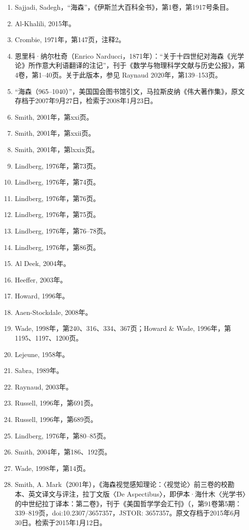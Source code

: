 \begin{enumerate}
\item Sajjadi, Sadegh，“海森”，《伊斯兰大百科全书》，第1卷，第1917号条目。
\item Al-Khalili, 2015年。
\item Crombie, 1971年，第147页，注释2。
\item 恩里科·纳尔杜奇（Enrico Narducci，1871年）：“关于十四世纪对海森《光学论》所作意大利语翻译的注记”，刊于《数学与物理科学文献与历史公报》，第4卷，第1–40页。关于此版本，参见 Raynaud 2020年，第139–153页。
\item “海森（965–1040）”，美国国会图书馆引文，马拉斯皮纳《伟大著作集》，原文存档于2007年9月27日，检索于2008年1月23日。
\item Smith, 2001年，第xxi页。
\item Smith, 2001年，第xxii页。
\item Smith, 2001年，第lxxix页。
\item Lindberg, 1976年，第73页。
\item Lindberg, 1976年，第74页。
\item Lindberg, 1976年，第76页。
\item Lindberg, 1976年，第75页。
\item Lindberg, 1976年，第76–78页。
\item Lindberg, 1976年，第86页。
\item Al Deek, 2004年。
\item Heeffer, 2003年。
\item Howard, 1996年。
\item Aaen-Stockdale, 2008年。
\item Wade, 1998年，第240、316、334、367页；Howard & Wade, 1996年，第1195、1197、1200页。
\item Lejeune, 1958年。
\item Sabra, 1989年。
\item Raynaud, 2003年。
\item Russell, 1996年，第691页。
\item Russell, 1996年，第689页。
\item Lindberg, 1976年，第80–85页。
\item Smith, 2004年，第186、192页。
\item Wade, 1998年，第14页。
\item Smith, A. Mark（2001年），《海森视觉感知理论：〈视觉论〉前三卷的校勘本、英文译文与评注，拉丁文版〈De Aspectibus〉，即伊本·海什木〈光学书〉的中世纪拉丁译本：第二卷》，刊于《美国哲学学会汇刊》（，第91卷第5期：339–819页，doi:10.2307/3657357，JSTOR: 3657357。原文存档于2015年6月30日。检索于2015年1月12日。

\end{enumerate}
